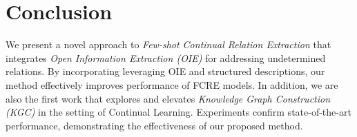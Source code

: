 \section{Conclusion}
We present a novel approach to \textit{Few-shot Continual Relation Extraction} that integrates \textit{Open Information Extraction (OIE)} for addressing undetermined relations. By incorporating leveraging OIE and structured descriptions, our method effectively improves performance of FCRE models. In addition, we are also the first work that explores and elevates \textit{Knowledge Graph Construction (KGC)} in the setting of Continual Learning. Experiments confirm state-of-the-art performance, demonstrating the effectiveness of our proposed method.
